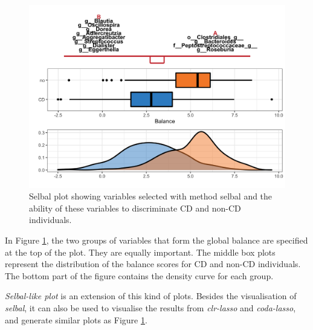 \documentclass[openany]{book}
\newenvironment{Shaded}{\begin{snugshade}}{\end{snugshade}}
\newcommand{\KeywordTok}[1]{\textcolor[rgb]{0.13,0.29,0.53}{\textbf{#1}}}
\newcommand{\DataTypeTok}[1]{\textcolor[rgb]{0.13,0.29,0.53}{#1}}
\newcommand{\StringTok}[1]{\textcolor[rgb]{0.31,0.60,0.02}{#1}}
\newcommand{\CommentTok}[1]{\textcolor[rgb]{0.56,0.35,0.01}{\textit{#1}}}
\newcommand{\OperatorTok}[1]{\textcolor[rgb]{0.81,0.36,0.00}{\textbf{#1}}}
\newcommand{\NormalTok}[1]{#1}
\begin{document}
\begin{figure}

{\centering \includegraphics[width=1\linewidth]{./Generated_plots/selbalCD-1} 

}

\caption{Selbal plot showing variables selected with method selbal and the ability of these variables to discriminate CD and non-CD individuals.}\label{fig:selbalCD}
\end{figure}

In Figure \ref{fig:selbalCD}, the two groups of variables that form the
global balance are specified at the top of the plot. They are equally
important. The middle box plots represent the distribution of the
balance scores for CD and non-CD individuals. The bottom part of the
figure contains the density curve for each group.

\emph{Selbal-like plot} is an extension of this kind of plots. Besides
the visualisation of \emph{selbal}, it can also be used to visualise the
results from \emph{clr-lasso} and \emph{coda-lasso}, and generate
similar plots as Figure \ref{fig:selbalCD}.

\begin{Shaded}
\end{Shaded}
\end{document}
